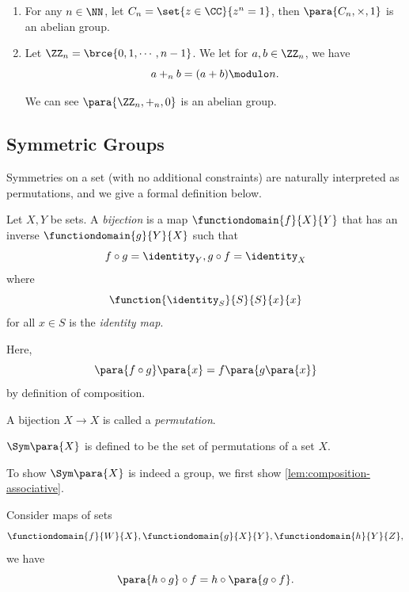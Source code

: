 \begin{examples}
    \begin{enumerate}
        \item For any \(n \in \NN\), let \(C_n = \set{z \in \CC}{z^n = 1}\), then \(\para{C_n, \times, 1}\) is an abelian group.
        \item Let \(\ZZ_n = \brce{0, 1, \cdots, n - 1}\). We let for \(a, b \in \ZZ_n\), we have
        \[
            a +_n b = (a + b) \modulo n.
        \]

        We can see \(\para{\ZZ_n, +_n, 0}\) is an abelian group.
    \end{enumerate}
\end{examples}

\subsection{Symmetric Groups}
\label{sec:symmetric-groups}

Symmetries on a set (with no additional constraints) are naturally interpreted as permutations, and we give a formal definition below.

\begin{definition}
    \label{def:bijection-permutation}%
    Let \(X, Y\) be sets. A \emph{bijection} is a map \(\functiondomain{f}{X}{Y}\) that has an inverse \(\functiondomain{g}{Y}{X}\) such that
    \[
        f \circ g = \identity_Y, g \circ f = \identity_X
    \]
    where
    \[
        \function{\identity_S}{S}{S}{x}{x}
    \]
    for all \(x \in S\) is the \emph{identity map}.

    Here,
    \[
        \para{f \circ g}\para{x} = f \para{g \para{x}}
    \]
    by definition of composition.

    A bijection \(X \to X\) is called a \emph{permutation}.
\end{definition}

\begin{definition}
    \label{def:symmetry-group}%
    \(\Sym\para{X}\) is defined to be the set of permutations of a set \(X\).
\end{definition}

To show \(\Sym\para{X}\) is indeed a group, we first show \autoref{lem:composition-associative}.

\begin{lemma}
    \label{lem:composition-associative}%
    Consider maps of sets
    \[
        \functiondomain{f}{W}{X}, \functiondomain{g}{X}{Y}, \functiondomain{h}{Y}{Z},
    \]
    we have
    \[
        \para{h \circ g} \circ f = h \circ \para{g \circ f}.
    \]
\end{lemma}

